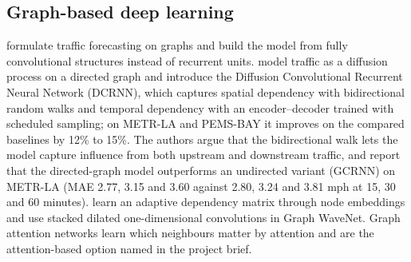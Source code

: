 \documentclass[11pt,a4paper]{article}
\begin{document}
\subsection{Graph-based deep learning}
\citet{yu2018stgcn} formulate traffic forecasting on graphs and build the model from fully convolutional structures instead of recurrent units.
\citet{li2018dcrnn} model traffic as a diffusion process on a directed graph and introduce the Diffusion Convolutional Recurrent Neural Network (DCRNN), which captures spatial dependency with bidirectional random walks and temporal dependency with an encoder--decoder trained with scheduled sampling; on METR-LA and PEMS-BAY it improves on the compared baselines by 12\% to 15\%.
The authors argue that the bidirectional walk lets the model capture influence from both upstream and downstream traffic, and report that the directed-graph model outperforms an undirected variant (GCRNN) on METR-LA (MAE 2.77, 3.15 and 3.60 against 2.80, 3.24 and 3.81 mph at 15, 30 and 60 minutes).
\citet{wu2019graphwavenet} learn an adaptive dependency matrix through node embeddings and use stacked dilated one-dimensional convolutions in Graph WaveNet.
Graph attention networks \citep{velickovic2018gat} learn which neighbours matter by attention and are the attention-based option named in the project brief.
\end{document}
